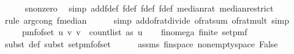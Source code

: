 \begin{isabellebody}
\ \ \ \ \isamarkupfalse%
\ s{}{\isacharunderscore}{\kern0pt}nonzero\ \isamarkupfalse%
\ {\isacharparenleft}{\kern0pt}simp\ add{\isacharcolon}{\kern0pt}f{\isacharunderscore}{\kern0pt}def\ f{\isacharprime}{\kern0pt}{\isacharunderscore}{\kern0pt}def\ f{}{\isacharunderscore}{\kern0pt}def\ f{}{\isacharunderscore}{\kern0pt}def\ median{\isacharunderscore}{\kern0pt}rat\ median{\isacharunderscore}{\kern0pt}restrict{\isacharparenright}{\kern0pt}\isanewline
\ \ \ \ \isamarkupfalse%
\ {\isacharparenleft}{\kern0pt}rule\ arg{\isacharunderscore}{\kern0pt}cong{}{\isacharbrackleft}{\kern0pt}\ f{\isacharequal}{\kern0pt}{\isachardoublequoteopen}median{\isachardoublequoteclose}{\isacharbrackright}{\kern0pt}{\isacharparenright}{\kern0pt}\isanewline
\ \ \ \ \isamarkupfalse%
\ {\isacharparenleft}{\kern0pt}simp\ add{\isacharcolon}{\kern0pt}of{\isacharunderscore}{\kern0pt}rat{\isacharunderscore}{\kern0pt}divide\ of{\isacharunderscore}{\kern0pt}rat{\isacharunderscore}{\kern0pt}sum\ of{\isacharunderscore}{\kern0pt}rat{\isacharunderscore}{\kern0pt}mult{\isacharcomma}{\kern0pt}\ simp{\isacharparenright}{\kern0pt}\isanewline
\isanewline
\ \ \isamarkupfalse%
\ {\isasymOmega}\ \ {\isachardoublequoteopen}{\isasymOmega}\ {\isacharequal}{\kern0pt}\ pmf{\isacharunderscore}{\kern0pt}of{\isacharunderscore}{\kern0pt}set\ {\isacharbraceleft}{\kern0pt}{\isacharparenleft}{\kern0pt}u{\isacharcomma}{\kern0pt}\ v{\isacharparenright}{\kern0pt}{\isachardot}{\kern0pt}\ v\ {\isacharless}{\kern0pt}\ count{\isacharunderscore}{\kern0pt}list\ as\ u{\isacharbraceright}{\kern0pt}{\isachardoublequoteclose}\isanewline
\ \ \isamarkupfalse%
\ fin{\isacharunderscore}{\kern0pt}omega{\isacharcolon}{\kern0pt}\ {\isachardoublequoteopen}finite\ {\isacharparenleft}{\kern0pt}set{\isacharunderscore}{\kern0pt}pmf\ {\isasymOmega}{\isacharparenright}{\kern0pt}{\isachardoublequoteclose}\isanewline
\ \ \ \ \isamarkupfalse%
\ {\isacharparenleft}{\kern0pt}subst\ {\isasymOmega}{\isacharunderscore}{\kern0pt}def{\isacharcomma}{\kern0pt}\ subst\ set{\isacharunderscore}{\kern0pt}pmf{\isacharunderscore}{\kern0pt}of{\isacharunderscore}{\kern0pt}set{\isacharparenright}{\kern0pt}\isanewline
\ \ \ \ \isamarkupfalse%
\ assms{\isacharparenleft}{\kern0pt}{}{\isacharparenright}{\kern0pt}\ fin{\isacharunderscore}{\kern0pt}space\ non{\isacharunderscore}{\kern0pt}empty{\isacharunderscore}{\kern0pt}space\ False\ \isamarkupfalse%

\end{isabellebody}
